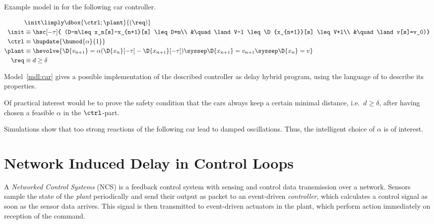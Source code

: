     \begin{algorithm}
        \caption{Example model in \ddL for the following car controller.}
        \label{mdl:car} %
        \begin{align*}
            &\init \limply \dbox{\ctrl;\plant}{(\req)}\\
            \init &\equiv \hsc[-\tau]{
                (D-m\leq x_n[s]-x_{n+1}[s] \leq D+m\\
                &\quad\land V-l \leq\D{x_{n+1}}[s] \leq V+l\\
                &\quad\land v[s]=v_0)}\\
            \ctrl &\equiv \hupdate{\humod{\alpha}{1}}\\
            \plant &\equiv \hevolve{
                \D{v_{n+1}} = \alpha(\D{x_n}[-\tau]-\D{x_{n+1}}[-\tau])\syssep
                \D{x_{n+1}} = v_{n+1}\syssep
                \D{x_n} = v
            }\\
            \req &\equiv d\geq \delta
        \end{align*}
    \end{algorithm}

    Model~\ref{mdl:car} gives a possible implementation of the described controller as delay hybrid program, using the language of \ddL to describe its properties.

    Of practical interest would be to prove the safety condition that the cars always keep a certain minimal distance, i.e.\ $d\geq\delta$, after having chosen a feasible $\alpha$ in the $\ctrl$-part.
    
    Simulations show that too strong reactions of the following car lead to damped oscillations. Thus, the intelligent choice of $\alpha$ is of interest.


\section{Network Induced Delay in Control Loops}

    A \emph{Networked Control Systems} (NCS) is a feedback control system with sensing and control data transmission over a network.
    Sensors sample the state of the \emph{plant} periodically and send their output as packet to an event-driven \emph{controller}, which calculates a control signal as soon as the sensor data arrives. This signal is then transmitted to event-driven actuators in the plant, which perform action immediately on reception of the command.


